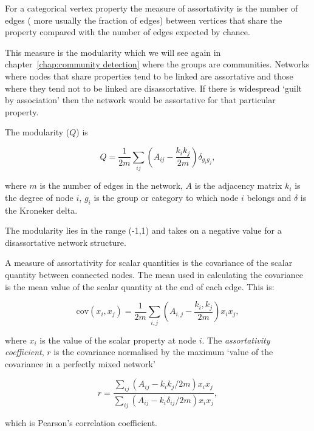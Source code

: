For a categorical vertex property the measure of assortativity is the number of edges ( more usually the fraction of edges) between vertices that share the property compared with the number of edges expected by chance.

This measure is the modularity which we will see again in chapter~\ref{chap:community detection} where the groups are communities. Networks where nodes that share properties tend to be linked are assortative and those where they tend not to be linked are disassortative. If there is widespread `guilt by association'\cite{oliver2000guilt} then the network would be assortative for that particular property. 

The modularity ($Q$) is

\begin{equation}
    Q = \frac{1}{2m}\sum_{ij}(A_{ij}-\frac{k_ik_j}{2m})\delta_{g_ig_j},
    \label{eq:categorical assortativity}
\end{equation}

where $m$ is the number of edges in the network, $A$ is the adjacency matrix $k_i$ is the degree of node $i$, $g_i$ is the group or category to which node $i$ belongs and $\delta$ is the Kroneker delta. 

The modularity lies in the range (-1,1) and takes on a negative value for a disassortative network structure.

A measure of assortativity for scalar quantities is the covariance of the scalar quantity between connected nodes. The mean used in calculating the covariance is the mean value of the scalar quantity at the end of each edge. This is:

\begin{equation}
   \textrm{cov}(x_i,x_j)  = \frac{1}{2m}\sum_{i,j}(A_{i,j}-\frac{k_i,k_j}{2m})x_ix_j,
   \label{eq:assortativity covariance of xi and xj over edges}
\end{equation}

where $x_i$ is the value of the scalar property at node $i$. The \textit{assortativity coefficient}, $r$ is the covariance normalised by the maximum `value of the covariance in a perfectly mixed network'\cite{newman2018networks}

 \begin{equation}
     r = \frac{\sum_{ij}(A_{ij}-k_ik_j/2m)x_ix_j}{\sum_{ij}(A_{ij}-k_i\delta_{ij}/2m)x_ix_j},
 \end{equation}
 
 which is Pearson's correlation coefficient\cite{newman2018networks}.
 
